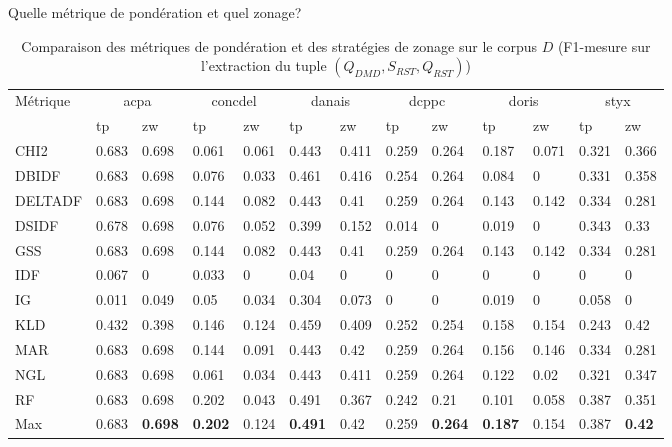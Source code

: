 \documentclass[newPxFont,pagenumber]{beamer}
\begin{document}
\begin{frame}{Quelle métrique de pondération et quel zonage?}
\begin{table}[]
\tiny
\begin{flushleft}
\caption{Comparaison des métriques de pondération et des stratégies de zonage sur le corpus $D$ (F1-mesure sur l'extraction du tuple $(Q_{DMD},S_{RST}, Q_{RST})$)}
\label{my-label}
\begin{tabular}{l|ll|ll|ll|ll|ll|ll}
Métrique & \multicolumn{2}{c|}{acpa} &  \multicolumn{2}{c|}{concdel}  &  \multicolumn{2}{c|}{danais} &  \multicolumn{2}{c|}{dcppc} &  \multicolumn{2}{c|}{doris}   &  \multicolumn{2}{c}{styx}    \\ \noalign{\smallskip}
\hline
         & tp    & zw    & tp      & zw    & tp     & zw    & tp    & zw    & tp    & zw    & tp    & zw    \\ \noalign{\smallskip}
\hline
CHI2     & 0.683 & 0.698 & 0.061   & 0.061 & 0.443  & 0.411 & 0.259 & 0.264 & 0.187 & 0.071 & 0.321 & 0.366 \\
DBIDF    & 0.683 & 0.698 & 0.076   & 0.033 & 0.461  & 0.416 & 0.254 & 0.264 & 0.084 & 0     & 0.331 & 0.358 \\
DELTADF  & 0.683 & 0.698 & 0.144   & 0.082 & 0.443  & 0.41  & 0.259 & 0.264 & 0.143 & 0.142 & 0.334 & 0.281 \\
DSIDF    & 0.678 & 0.698 & 0.076   & 0.052 & 0.399  & 0.152 & 0.014 & 0     & 0.019 & 0     & 0.343 & 0.33  \\
GSS      & 0.683 & 0.698 & 0.144   & 0.082 & 0.443  & 0.41  & 0.259 & 0.264 & 0.143 & 0.142 & 0.334 & 0.281 \\
IDF      & 0.067 & 0     & 0.033   & 0     & 0.04   & 0     & 0     & 0     & 0     & 0     & 0     & 0     \\
IG       & 0.011 & 0.049 & 0.05    & 0.034 & 0.304  & 0.073 & 0     & 0     & 0.019 & 0     & 0.058 & 0     \\
KLD      & 0.432 & 0.398 & 0.146   & 0.124 & 0.459  & 0.409 & 0.252 & 0.254 & 0.158 & 0.154 & 0.243 & 0.42  \\
MAR      & 0.683 & 0.698 & 0.144   & 0.091 & 0.443  & 0.42  & 0.259 & 0.264 & 0.156 & 0.146 & 0.334 & 0.281 \\
NGL      & 0.683 & 0.698 & 0.061   & 0.034 & 0.443  & 0.411 & 0.259 & 0.264 & 0.122 & 0.02  & 0.321 & 0.347 \\
RF       & 0.683 & 0.698 & 0.202   & 0.043 & 0.491  & 0.367 & 0.242 & 0.21  & 0.101 & 0.058 & 0.387 & 0.351 \\ \hline
 \noalign{\smallskip}
\hline
Max        & 0.683 & \textbf{0.698} & \textbf{0.202}   & 0.124  & \textbf{0.491}  & 0.42  & 0.259 & \textbf{0.264} & \textbf{0.187} & 0.154 & 0.387 & \textbf{0.42} 
\end{tabular}


\end{flushleft}
\end{table}
\end{frame}
\end{document}
